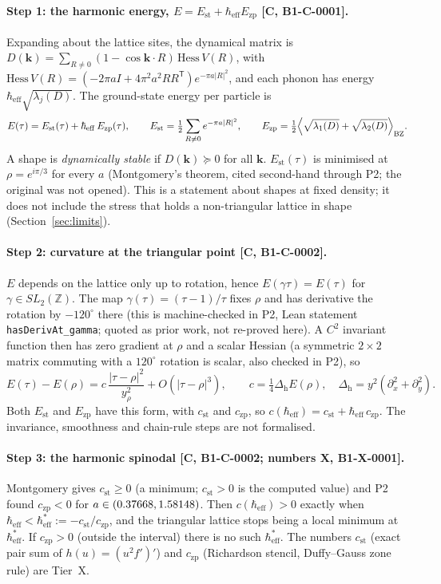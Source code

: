 \documentclass[10pt]{article}
\newcommand{\tier}[1]{\textsf{[#1]}}
\newcommand{\hb}{\hbar_{\mathrm{eff}}}
\newcommand{\Ezp}{E_{\mathrm{zp}}}
\newcommand{\Est}{E_{\mathrm{st}}}
\newcommand{\Lap}{\Delta_{\!\mathrm{h}}}
\begin{document}
\paragraph{Step 1: the harmonic energy, $E=\Est+\hb\Ezp$ \tier{C, B1-C-0001}.} Expanding about the lattice sites, the dynamical matrix is
$D(\mathbf k)=\sum_{R\ne0}(1-\cos\mathbf k\!\cdot\!R)\,\mathrm{Hess}\,V(R)$, with $\mathrm{Hess}\,V(R)=(-2\pi a I+4\pi^2a^2RR^{\mathsf T})e^{-\pi a|R|^2}$, and each phonon has energy $\hb\sqrt{\lambda_j(D)}$. The ground-state energy per
particle is
\[E(\tau)=\Est(\tau)+\hb\,\Ezp(\tau),\qquad \Est=\tfrac12\sum_{R\ne0}e^{-\pi a|R|^2},\qquad \Ezp=\tfrac12\Bigl\langle\sqrt{\lambda_1(D)}+\sqrt{\lambda_2(D)}\Bigr\rangle_{\mathrm{BZ}}.\]
A shape is \emph{dynamically stable} if $D(\mathbf k)\succeq0$ for all $\mathbf k$. $\Est(\tau)$ is minimised at $\rho=e^{i\pi/3}$ for every $a$ (Montgomery's theorem, cited second-hand through P2; the original was not opened). This is a statement about shapes at fixed density; it does not include the
stress that holds a non-triangular lattice in shape (Section~\ref{sec:limits}).

\paragraph{Step 2: curvature at the triangular point \tier{C, B1-C-0002}.} $E$ depends on the lattice only up to rotation, hence $E(\gamma\tau)=E(\tau)$ for $\gamma\in SL_2(\mathbb Z)$. The map $\gamma(\tau)=(\tau-1)/\tau$ fixes $\rho$ and has derivative the
rotation by $-120^\circ$ there (this is machine-checked in P2, Lean statement \texttt{hasDerivAt\_gamma}; quoted as prior work, not re-proved here). A $C^2$ invariant function then has zero gradient at $\rho$ and a scalar Hessian (a symmetric $2\times2$ matrix commuting with a $120^\circ$
rotation is scalar, also checked in P2), so
\[E(\tau)-E(\rho)=c\,\frac{|\tau-\rho|^2}{y_\rho^2}+O(|\tau-\rho|^3),\qquad c=\tfrac14\Lap E(\rho),\quad \Lap=y^2(\partial_x^2+\partial_y^2).\]
Both $\Est$ and $\Ezp$ have this form, with $c_{\mathrm{st}}$ and $c_{\mathrm{zp}}$, so $c(\hb)=c_{\mathrm{st}}+\hb\,c_{\mathrm{zp}}$. The invariance, smoothness and chain-rule steps are not formalised.

\paragraph{Step 3: the harmonic spinodal \tier{C, B1-C-0002; numbers X, B1-X-0001}.} Montgomery gives $c_{\mathrm{st}}\ge0$ (a minimum; $c_{\mathrm{st}}>0$ is the computed value) and P2 found $c_{\mathrm{zp}}<0$ for $a\in(0.37668,1.58148)$. Then $c(\hb)>0$ exactly when $\hb<\hb^*:=-c_{\mathrm{st}}/c_{\mathrm{zp}}$, and the
triangular lattice stops being a local minimum at $\hb^*$. If $c_{\mathrm{zp}}>0$ (outside the interval) there is no such $\hb^*$. The numbers $c_{\mathrm{st}}$ (exact pair sum of $h(u)=(u^2f')'$) and $c_{\mathrm{zp}}$ (Richardson stencil, Duffy--Gauss zone rule) are Tier~X.
\end{document}
